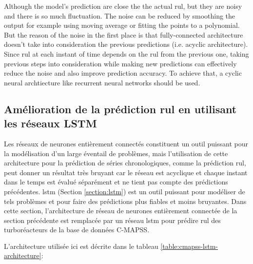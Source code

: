 Although the model's prediction are close the the actual \acrshort{rul}, but they are noisy and there is so much fluctuation. The noise can be reduced by smoothing the output for example using moving average or fitting the points to a polynomial. But the reason of the noise in the first place is that fully-connected architecture doesn't take into consideration the previous predictions (i.e. acyclic architecture). Since \acrshort{rul} at each instant of time depends on the \acrshort{rul} from the previous one, taking previous steps into consideration while making new predictions can effectively reduce the noise and also improve prediction accuracy. To achieve that, a cyclic neural archtiecture like recurrent neural networks should be used.

\subsection{Amélioration de la prédiction \acrshort{rul} en utilisant les réseaux LSTM}

Les réseaux de neurones entièrement connectés constituent un outil puissant pour la modélisation d'un large éventail de problèmes, mais l'utilisation de cette architecture pour la prédiction de séries chronologiques, comme la prédiction \acrshort{rul}, peut donner un résultat très bruyant car le réseau est acyclique et chaque instant dans le temps est évalué séparément et ne tient pas compte des prédictions précédentes. \acrlong{lstm} (Section \ref{section:lstm}) est un outil puissant pour modéliser de tels problèmes et pour faire des prédictions plus fiables et moins bruyantes. Dans cette section, l'architecture de réseau de neurones entièrement connectée de la section précédente est remplacée par un réseau \acrshort{lstm} pour prédire \acrshort{rul} des turboréacteurs de la base de données C-MAPSS.

L'architecture utilisée ici est décrite dans le tableau \ref{table:cmapss-lstm-architecture}:

